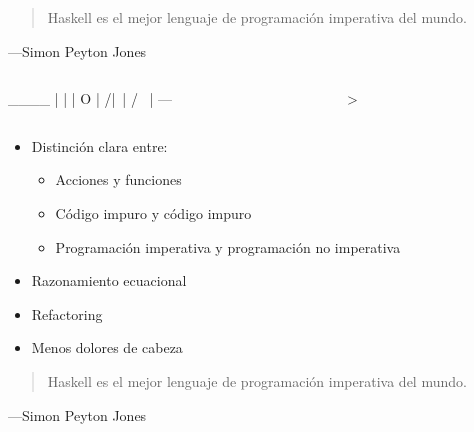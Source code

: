 \documentclass[spanish]{beamer}
\begin{document}

\begin{frame}
  \begin{quote}
    Haskell es el mejor lenguaje de programación imperativa del mundo.
  \end{quote}
  \hfill---Simon Peyton Jones
\end{frame}


\begin{frame}[fragile]
  \begin{columns}[onlytextwidth,T]
    \begin{column}{.5\textwidth}
        \begin{code}
 ____
 |  |
 |  O
 | /|\
 | / \
 |
---
        \end{code}
    \end{column}
    \begin{column}{.5\textwidth}
      \begin{code}
>
      \end{code}
    \end{column}
  \end{columns}
\end{frame}


\begin{frame}
  \begin{itemize}
  \item
    Distinción clara entre:
    \begin{itemize}
    \item Acciones y funciones
    \item Código impuro y código impuro
    \item Programación imperativa y programación no imperativa
    \end{itemize}
  \item
    Razonamiento ecuacional
  \item
    Refactoring
  \item
    Menos dolores de cabeza
  \end{itemize}
\end{frame}


\begin{frame}
  \begin{quote}
    Haskell es el mejor lenguaje de programación imperativa del mundo.
  \end{quote}
  \hfill---Simon Peyton Jones
\end{frame}
\end{document}
